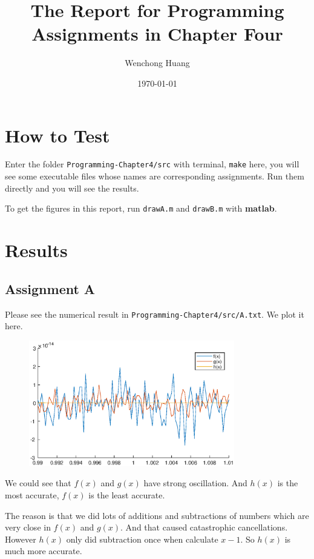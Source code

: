 \documentclass[11pt,en]{elegantpaper}
\title{The Report for Programming Assignments in Chapter Four}
\author{Wenchong Huang}
\date{\today}
\begin{document}
\maketitle


\section{How to Test}

Enter the folder \verb|Programming-Chapter4/src| with terminal, \verb |make| here, you will see some executable files whose names are corresponding assignments. Run them directly and you will see the results.

To get the figures in this report, run \verb|drawA.m| and \verb|drawB.m| with \textbf{matlab}.

\section{Results}

\subsection{Assignment A}

Please see the numerical result in \verb|Programming-Chapter4/src/A.txt|. We plot it here.

\begin{figure}[H]
    \centering
    \includegraphics[width=0.8\textwidth]{figure/A.eps}
\end{figure}

We could see that $f(x)$ and $g(x)$ have strong oscillation. And $h(x)$ is the most accurate, $f(x)$ is the least accurate.

The reason is that we did lots of additions and subtractions of numbers which are very close in $f(x)$ and $g(x)$. And that caused catastrophic cancellations. However $h(x)$ only did subtraction once when calculate $x-1$. So $h(x)$ is much more accurate.
\end{document}
